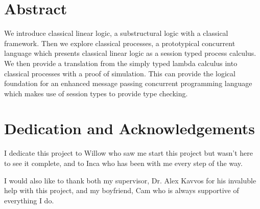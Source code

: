 \chapter*{Abstract}

We introduce classical linear logic, a substructural logic with a classical framework.
Then we explore classical processes, a prototypical concurrent language which presents 
classical linear logic as a session typed process calculus. We then provide a translation 
from the simply typed lambda calculus into classical processes with a proof of simulation. 
This can provide the logical foundation for an enhanced message passing concurrent programming 
language which makes use of session types to provide type checking.  

\chapter*{Dedication and Acknowledgements}

I dedicate this project to Willow who saw me start this project but wasn't here to see it complete, 
and to Inca who has been with me every step of the way. 

\noindent
I would also like to thank both my supervisor, Dr. Alex Kavvos for his invaluble help with this project, 
and my boyfriend, Cam who is always supportive of everything I do.

